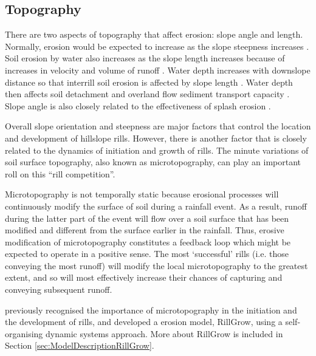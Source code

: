 \subsection{Topography}
\label{sec:Topography}

There are two aspects of topography that affect erosion: slope angle and length.
Normally, erosion would be expected to increase as the slope steepness increases
\citep{liu1994-1835}. Soil erosion by water also increases as the slope length
increases because of increases in velocity and volume of runoff
\citep{liu2000-1759}. Water depth increases with downslope distance so that
interrill soil erosion is affected by slope length \citep{gilley1985-154}.
Water depth then affects soil detachment and overland flow sediment transport
capacity \citep{gilley1985-147}. Slope angle is also closely related to the
effectiveness of splash erosion \citep{kinnell2000-discourse,vandijk2003-153}.

Overall slope orientation and steepness are major factors that control the
location and development of hillslope rills.
However, there is another factor that is closely related to the dynamics of
initiation and growth of rills. The minute variations of soil surface
topography, also known as microtopography, can play an  important roll on this
``rill competition''.

Microtopography is not temporally static because erosional processes will
continuously modify the surface of soil during a rainfall event. As a
result, runoff during the latter part of the event will flow over a soil
surface that has been modified and different from the surface earlier in the
rainfall. Thus, erosive modification of microtopography constitutes a feedback
loop which might be expected to operate in a positive sense. The most
`successful' rills (i.e. those conveying the most runoff) will modify the local
microtopography to the greatest extent, and so will most effectively increase
their chances of capturing and conveying subsequent runoff.

\citet{favis-mortlock2000-2173} previously recognised the importance of
microtopography in the initiation and the development of rills, and developed a
erosion model, RillGrow, using a self-organising dynamic systems approach. More
about RillGrow is included in Section \ref{sec:ModelDescriptionRillGrow}.

